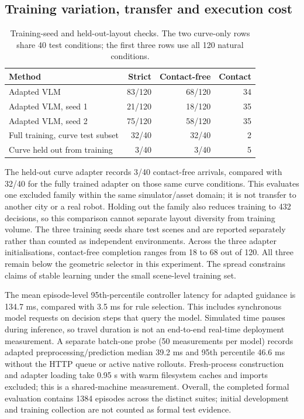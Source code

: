 \documentclass[10pt,a4paper]{article}
\begin{document}
\subsection{Training variation, transfer and execution cost}
\begin{table}[tb]\centering\small\caption{Training-seed and held-out-layout checks. The two curve-only rows share 40 test conditions; the first three rows use all 120 natural conditions.}\begin{tabular}{lrrr}\toprule
Method & Strict & Contact-free & Contact \\ \midrule
Adapted VLM & 83/120 & 68/120 & 34 \\
Adapted VLM, seed 1 & 21/120 & 18/120 & 35 \\
Adapted VLM, seed 2 & 75/120 & 58/120 & 35 \\
Full training, curve test subset & 32/40 & 32/40 & 2 \\
Curve held out from training & 3/40 & 3/40 & 5 \\
\bottomrule\end{tabular}\end{table}
The held-out curve adapter records 3/40 contact-free arrivals, compared with 32/40 for the fully trained adapter on those same curve conditions. This evaluates one excluded family within the same simulator/asset domain; it is not transfer to another city or a real robot. Holding out the family also reduces training to 432 decisions, so this comparison cannot separate layout diversity from training volume. The three training seeds share test scenes and are reported separately rather than counted as independent environments.
Across the three adapter initialisations, contact-free completion ranges from 18 to 68 out of 120. All three remain below the geometric selector in this experiment. The spread constrains claims of stable learning under the small scene-level training set.

The mean episode-level 95th-percentile controller latency for adapted guidance is 134.7 ms, compared with 3.5 ms for rule selection. This includes synchronous model requests on decision steps that query the model. Simulated time pauses during inference, so travel duration is not an end-to-end real-time deployment measurement. A separate batch-one probe (50 measurements per model) records adapted preprocessing/prediction median 39.2 ms and 95th percentile 46.6 ms without the HTTP queue or active native rollouts. Fresh-process construction and adapter loading take 0.95 s with warm filesystem caches and imports excluded; this is a shared-machine measurement. Overall, the completed formal evaluation contains 1384 episodes across the distinct suites; initial development and training collection are not counted as formal test evidence.
\end{document}
